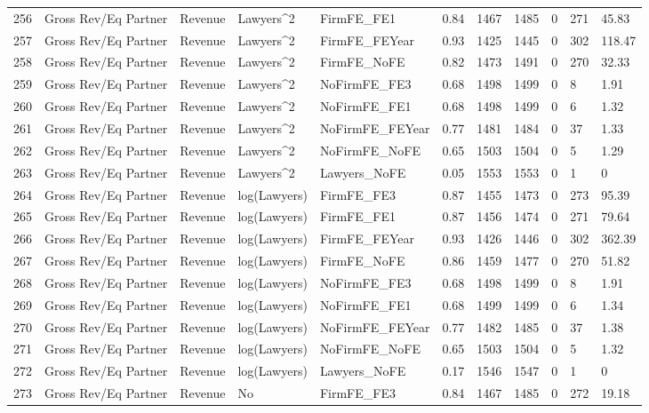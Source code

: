 \begin{table}[ht]
\begin{tabular}{rllllllllll}
  256 & Gross Rev/Eq Partner & Revenue & Lawyers^2 & FirmFE\_FE1 & 0.84 & 1467 & 1485 & 0 & 271 & 45.83 \\ 
  257 & Gross Rev/Eq Partner & Revenue & Lawyers^2 & FirmFE\_FEYear & 0.93 & 1425 & 1445 & 0 & 302 & 118.47 \\ 
  258 & Gross Rev/Eq Partner & Revenue & Lawyers^2 & FirmFE\_NoFE & 0.82 & 1473 & 1491 & 0 & 270 & 32.33 \\ 
  259 & Gross Rev/Eq Partner & Revenue & Lawyers^2 & NoFirmFE\_FE3 & 0.68 & 1498 & 1499 & 0 & 8 & 1.91 \\ 
  260 & Gross Rev/Eq Partner & Revenue & Lawyers^2 & NoFirmFE\_FE1 & 0.68 & 1498 & 1499 & 0 & 6 & 1.32 \\ 
  261 & Gross Rev/Eq Partner & Revenue & Lawyers^2 & NoFirmFE\_FEYear & 0.77 & 1481 & 1484 & 0 & 37 & 1.33 \\ 
  262 & Gross Rev/Eq Partner & Revenue & Lawyers^2 & NoFirmFE\_NoFE & 0.65 & 1503 & 1504 & 0 & 5 & 1.29 \\ 
  263 & Gross Rev/Eq Partner & Revenue & Lawyers^2 & Lawyers\_NoFE & 0.05 & 1553 & 1553 & 0 & 1 & 0 \\ 
  264 & Gross Rev/Eq Partner & Revenue & log(Lawyers) & FirmFE\_FE3 & 0.87 & 1455 & 1473 & 0 & 273 & 95.39 \\ 
  265 & Gross Rev/Eq Partner & Revenue & log(Lawyers) & FirmFE\_FE1 & 0.87 & 1456 & 1474 & 0 & 271 & 79.64 \\ 
  266 & Gross Rev/Eq Partner & Revenue & log(Lawyers) & FirmFE\_FEYear & 0.93 & 1426 & 1446 & 0 & 302 & 362.39 \\ 
  267 & Gross Rev/Eq Partner & Revenue & log(Lawyers) & FirmFE\_NoFE & 0.86 & 1459 & 1477 & 0 & 270 & 51.82 \\ 
  268 & Gross Rev/Eq Partner & Revenue & log(Lawyers) & NoFirmFE\_FE3 & 0.68 & 1498 & 1499 & 0 & 8 & 1.91 \\ 
  269 & Gross Rev/Eq Partner & Revenue & log(Lawyers) & NoFirmFE\_FE1 & 0.68 & 1499 & 1499 & 0 & 6 & 1.34 \\ 
  270 & Gross Rev/Eq Partner & Revenue & log(Lawyers) & NoFirmFE\_FEYear & 0.77 & 1482 & 1485 & 0 & 37 & 1.38 \\ 
  271 & Gross Rev/Eq Partner & Revenue & log(Lawyers) & NoFirmFE\_NoFE & 0.65 & 1503 & 1504 & 0 & 5 & 1.32 \\ 
  272 & Gross Rev/Eq Partner & Revenue & log(Lawyers) & Lawyers\_NoFE & 0.17 & 1546 & 1547 & 0 & 1 & 0 \\ 
  273 & Gross Rev/Eq Partner & Revenue & No & FirmFE\_FE3 & 0.84 & 1467 & 1485 & 0 & 272 & 19.18 \\ 

\end{tabular}
\end{table}
